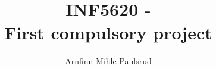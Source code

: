 \documentclass[a4paper, english,10pt]{article}
\begin{document}
\title{INF5620 - \\  First compulsory project}
\author{Arnfinn Mihle Paulsrud}
\maketitle





\end{document}
